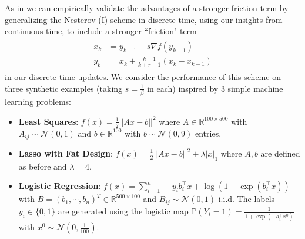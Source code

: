 As in \citet{su2014differential} we can empirically validate the advantages of a stronger friction term by generalizing the Nesterov (I) scheme in discrete-time, using our insights from continuous-time, to include a stronger ``friction" term
\begin{align}
\begin{split}
    x_k &= y_{k-1} - s \nabla f(y_{k-1})\\
    y_k &= x_k + \frac{k-1}{k+r-1} (x_k - x_{k-1}) \label{nesterov_r}
\end{split}
\end{align}
in our discrete-time updates. We consider the performance of this scheme on three synthetic examples (taking $s=\frac{1}{\beta}$ in each) inspired by 3 simple machine learning problems:

\begin{itemize}
\item \textbf{Least Squares}: $f(x) = \frac{1}{2} || Ax - b||^2$ where $A \in \mathbb{R}^{100 \times 500}$ with $A_{ij} \sim \mathcal{N}(0,1)$ and $b \in \mathbb{R}^{100}$ with $b \sim \mathcal{N}(0,9)$ entries.
\item \textbf{Lasso with Fat Design}: $f(x) = \frac{1}{2} ||Ax - b||^2 + \lambda |x|_1$ where $A, b$ are defined as before and $\lambda = 4$.
\item \textbf{Logistic Regression}: $f(x) = \sum_{i=1}^n -y_i b_i^\top x + \log(1+ \exp(b_i^\top x))$ with $B = (b_1, \cdots, b_n)^T \in \mathbb{R}^{500 \times 100}$ and $B_{ij} \sim \mathcal{N}(0,1)$ i.i.d. The labels $y_i \in \{0,1\}$ are generated using the logistic map $\mathbb{P}(Y_i=1) = \frac{1}{1+\exp(-a_i^\top x^0)}$ with $x^0 \sim \mathcal{N}(0,\frac{1}{100})$.
\end{itemize}

